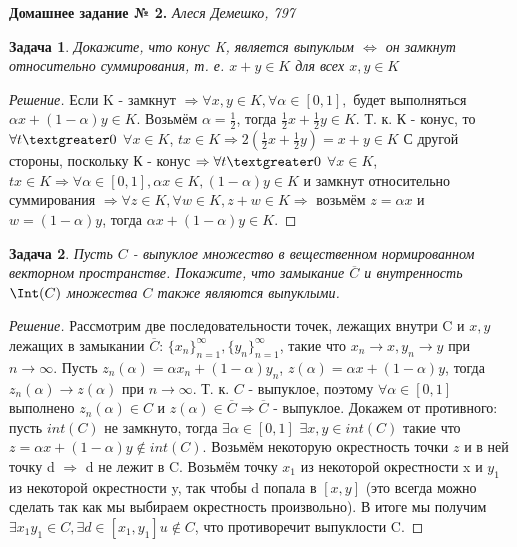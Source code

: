 \documentclass[a4paper]{article}
\newtheorem{problem}{Задача}
\begin{document}
\textbf{Домашнее задание № 2.} \textit{Алеся Демешко, 797}

\begin{problem}
Докажите, что конус K, является выпуклым $\Leftrightarrow$ он замкнут относительно суммирования, т. е. $x + y \in K$ для всех $x, y \in K$
\end{problem}

\begin{proof}[Решение]
Если K - замкнут $\Rightarrow \forall x, y \in K, \forall \alpha \in [0, 1],$ будет выполняться $\alpha x + (1 - \alpha) y \in K$. Возьмём $\alpha = \frac{1}{2}$, тогда $\frac{1}{2} x+ \frac{1}{2}y \in K$.
 Т. к. К - конус, то $\forall t \textgreater 0$ $ \forall x \in K$, $tx \in K \Rightarrow 2(\frac{1}{2}x+ \frac{1}{2}y) = x+y \in K$  \newline
С другой стороны, поскольку К - конус $\Rightarrow \forall t \textgreater 0$ $ \forall x \in K$, $t x \in K \Rightarrow \forall \alpha \in [0, 1], \alpha x \in K,  (1 - \alpha) y \in K$
и замкнут относительно суммирования $\Rightarrow \forall  z \in K, \forall w \in K, z+w \in K \Rightarrow$ возьмём $z =  \alpha x $ и $ w =  (1 - \alpha) y$, тогда $\alpha x + (1 - \alpha) y \in K$.
\end{proof}

\begin{problem}
Пусть $C$ -  выпуклое множество в вещественном нормированном векторном пространстве. Покажите, что замыкание $\overline{C}$ и внутренность $\Int(C)$ множества $C$ также являются выпуклыми.
\end{problem}

\begin{proof}[Решение]
Рассмотрим две последовательности точек, лежащих внутри C и $x, y$ лежащих в замыкании $\overline{C}$: $\{x_n\}_{n=1}^{\infty}, \{y_n\}_{n=1}^{\infty}$, такие что $x_n \rightarrow x, y_n \rightarrow y$ при $n\xrightarrow{}\infty$. Пусть $z_n(\alpha)= \alpha x_n + (1-\alpha)y_n$, $z(\alpha)= \alpha x + (1-\alpha)y$, тогда $z_n(\alpha) \rightarrow z(\alpha)$ при $n\xrightarrow{}\infty$. Т. к. $C$ - выпуклое, поэтому $\forall \alpha \in [0, 1]$  выполнено $z_n(\alpha)\in C$ и $z(\alpha)\in \overline{C} \Rightarrow \overline{C}$ - выпуклое.  \newline
Докажем от противного: пусть $int(C)$ не замкнуто, тогда $\exists \alpha \in [0,1]$ $\exists  x, y \in int(C)$ такие что $z = \alpha x+ (1-\alpha)y \notin int(C) $. Возьмём некоторую окрестность точки $z$ и в ней точку d $\Rightarrow$ d не лежит в C. Возьмём точку $x_1$ из некоторой окрестности x и $y_1$ из некоторой окрестности y, так чтобы d попала в $[x, y]$ (это всегда можно сделать так как мы выбираем окрестность произвольно). В итоге мы получим $\exists x_1 y_1 \in C, \exists d\in[x_1, y_1] u \notin C$, что противоречит выпуклости C.
\end{proof}
\end{document}
